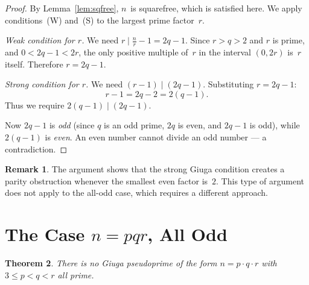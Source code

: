 \documentclass[12pt,a4paper]{amsart}
\newtheorem{theorem}{Theorem}[section]
\theoremstyle{definition}
\newtheorem{remark}[theorem]{Remark}
\begin{document}
\begin{proof}
By Lemma~\ref{lem:sqfree}, $n$~is squarefree, which is satisfied here.
We apply conditions~(W) and~(S) to the largest prime factor~$r$.

\medskip
\noindent\textit{Weak condition for $r$.}\quad
We need $r \mid \tfrac{n}{r} - 1 = 2q - 1$.
Since $r > q > 2$ and $r$ is prime, and $0 < 2q - 1 < 2r$,
the only positive multiple of~$r$ in the interval $(0, 2r)$ is~$r$ itself.
Therefore $r = 2q - 1$.

\medskip
\noindent\textit{Strong condition for $r$.}\quad
We need $(r - 1) \mid (2q - 1)$.
Substituting $r = 2q - 1$:
\[
  r - 1 = 2q - 2 = 2(q - 1).
\]
Thus we require $2(q-1) \mid (2q - 1)$.

Now $2q - 1$ is \emph{odd} (since $q$ is an odd prime, $2q$ is even,
and $2q - 1$ is odd), while $2(q - 1)$ is \emph{even}.
An even number cannot divide an odd number — a contradiction.
\end{proof}

\begin{remark}
The argument shows that the strong Giuga condition creates a parity obstruction
whenever the smallest even factor is~$2$.  This type of argument does not apply
to the all-odd case, which requires a different approach.
\end{remark}

\section{The Case \texorpdfstring{$n = pqr$}{n = pqr}, All Odd}
\label{sec:odd}

\begin{theorem}
\label{thm:pqr}
There is no Giuga pseudoprime of the form $n = p \cdot q \cdot r$
with $3 \le p < q < r$ all prime.
\end{theorem}
\end{document}
